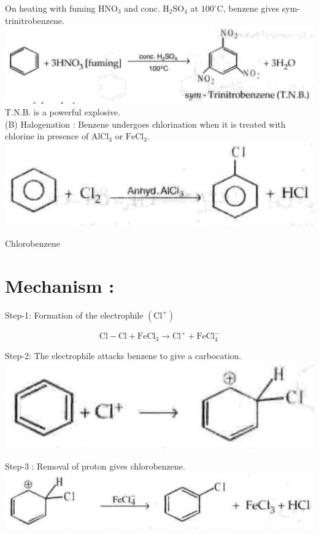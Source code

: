 \documentclass[10pt]{article}
\begin{document}
On heating with fuming $\mathrm{HNO}_{3}$ and conc. $\mathrm{H}_{2} \mathrm{SO}_{4}$ at $100^{\circ} \mathrm{C}$, benzene gives sym-trinitrobenzene.\\
\includegraphics[max width=\textwidth, center]{2025_01_28_8470952b98110cec3aabg-207(3)}\\
T.N.B. is a powerful explosive.\\
(B) Halogenation : Benzene undergoes chlorination when it is treated with chlorine in presence of $\mathrm{AlCl}_{3}$ or $\mathrm{FeCl}_{3}$.\\
\includegraphics[max width=\textwidth, center]{2025_01_28_8470952b98110cec3aabg-207}

Chlorobenzene

\section*{Mechanism :}
Step-1: Formation of the electrophile $\left(\mathrm{Cl}^{+}\right)$

$$
\mathrm{Cl}-\mathrm{Cl}+\mathrm{FeCl}_{3} \longrightarrow \mathrm{Cl}^{+}+\mathrm{FeCl}_{4}^{-}
$$

Step-2: The electrophile attacks benzene to give a carbocation.\\
\includegraphics[max width=\textwidth, center]{2025_01_28_8470952b98110cec3aabg-207(2)}

Step-3 : Removal of proton gives chlorobenzene.\\
\includegraphics[max width=\textwidth, center]{2025_01_28_8470952b98110cec3aabg-207(4)}
\end{document}
